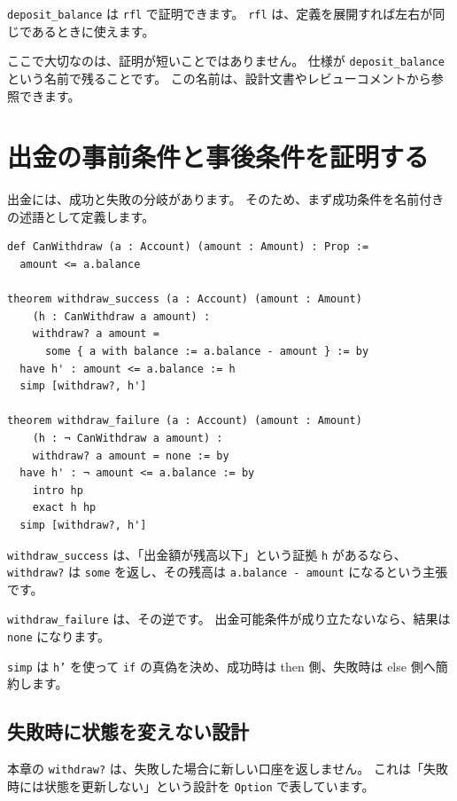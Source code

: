 \texttt{deposit\_balance} は \texttt{rfl} で証明できます。
\texttt{rfl} は、定義を展開すれば左右が同じであるときに使えます。

ここで大切なのは、証明が短いことではありません。
仕様が \texttt{deposit\_balance} という名前で残ることです。
この名前は、設計文書やレビューコメントから参照できます。

\section{出金の事前条件と事後条件を証明する}

出金には、成功と失敗の分岐があります。
そのため、まず成功条件を名前付きの述語として定義します。

\begin{listing}[htbp]
\begin{verbatim}
def CanWithdraw (a : Account) (amount : Amount) : Prop :=
  amount <= a.balance

theorem withdraw_success (a : Account) (amount : Amount)
    (h : CanWithdraw a amount) :
    withdraw? a amount =
      some { a with balance := a.balance - amount } := by
  have h' : amount <= a.balance := h
  simp [withdraw?, h']

theorem withdraw_failure (a : Account) (amount : Amount)
    (h : ¬ CanWithdraw a amount) :
    withdraw? a amount = none := by
  have h' : ¬ amount <= a.balance := by
    intro hp
    exact h hp
  simp [withdraw?, h']
\end{verbatim}
\caption{\texttt{withdraw\_success} と \texttt{withdraw\_failure}}
\label{lst:ch25-withdraw-proof}
\end{listing}

\texttt{withdraw\_success} は、「出金額が残高以下」という証拠 \texttt{h} があるなら、\texttt{withdraw?} は \texttt{some} を返し、その残高は \texttt{a.balance - amount} になるという主張です。

\texttt{withdraw\_failure} は、その逆です。
出金可能条件が成り立たないなら、結果は \texttt{none} になります。

\texttt{simp} は \texttt{h'} を使って \texttt{if} の真偽を決め、成功時は then 側、失敗時は else 側へ簡約します。

\subsection{失敗時に状態を変えない設計}

本章の \texttt{withdraw?} は、失敗した場合に新しい口座を返しません。
これは「失敗時には状態を更新しない」という設計を \texttt{Option} で表しています。


